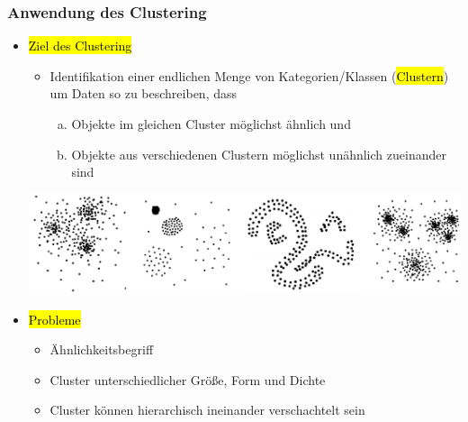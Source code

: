 \begin{frame}%
\frametitle{Anwendung des Clustering}

\begin{itemize}
\item \hl{Ziel des Clustering} 
\begin{itemize}
\item Identifikation einer endlichen Menge von Kategorien/Klassen
  (\hl{Clustern}) um Daten so zu beschreiben, dass 
\begin{enumerate}[(a)]
\item Objekte im gleichen Cluster möglichst ähnlich und 
\item Objekte aus verschiedenen Clustern möglichst unähnlich zueinander sind
\end{enumerate}

\end{itemize}

\begin{center}
\includegraphics[scale=.4]{fig7/cluster-formen.pdf}
\end{center}

\item \hl{Probleme} 
\begin{itemize}
\item Ähnlichkeitsbegriff 
\item Cluster unterschiedlicher Größe, Form und Dichte
\item Cluster können hierarchisch ineinander verschachtelt sein
\end{itemize}
\end{itemize}
\end{frame}


